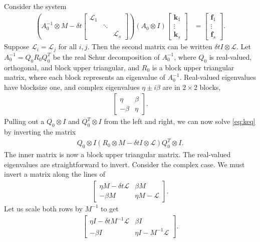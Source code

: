 \documentclass[a4paper,10pt]{article}
\begin{document}
Consider the system
%
\begin{align}\label{eq:keq}
\left( A_0^{-1}\otimes M - \delta t \begin{bmatrix} \mathcal{L}_1  & \\ & \ddots \\ && \mathcal{L}_s\end{bmatrix}\right)
	(A_0\otimes I)	\begin{bmatrix} \mathbf{k}_1 \\ \vdots \\ \mathbf{k}_s \end{bmatrix} 
& = \begin{bmatrix} \mathbf{f}_1 \\ \vdots \\ \mathbf{f}_s \end{bmatrix}.
\end{align}
%
Suppose $\mathcal{L}_i = \mathcal{L}_j$ for all $i,j$. Then the second matrix can 
be written $\delta t I\otimes\mathcal{L}$. 
Let $A_0^{-1} = Q_0R_0Q_0^T$ be the real Schur decomposition of $A_0^{-1}$, where
$Q_0$ is real-valued, orthogonal, and block upper triangular, and $R_0$ is a block
upper triangular matrix, where each block represents an eigenvalue of $A_0^{-1}$.
Real-valued eigenvalues have blocksize one, and complex eigenvalues $\eta\pm i\beta$
are in $2\times 2$ blocks,
%
\begin{align*}
\begin{bmatrix} \eta & \beta\\-\beta & \eta\end{bmatrix}.
\end{align*}
%
Pulling out a $Q_0\otimes I$ and $Q_0^T\otimes I$ from the left and right,
we can now solve \eqref{eq:keq} by inverting the matrix
%
\begin{align*}
Q_0\otimes I\left( R_0\otimes M - \delta t I \otimes \mathcal{L}\right)Q_0^T\otimes I.
\end{align*}
%
The inner matrix is now a block upper triangular matrix. The real-valued eigenvalues
are straightforward to invert. Consider the complex case. We must invert a matrix along
the lines of
%
\begin{align*}
\begin{bmatrix} \eta M - \delta t \mathcal{L} & \beta M\\-\beta M & \eta M - \mathcal{L}\end{bmatrix}.
\end{align*}
%
Let us scale both rows by $M^{-1}$ to get
%
\begin{align*}
\begin{bmatrix} \eta I - \delta t M^{-1}\mathcal{L} & \beta I\\
-\beta I & \eta I - M^{-1}\mathcal{L}\end{bmatrix}.
\end{align*}
%
\end{document}
